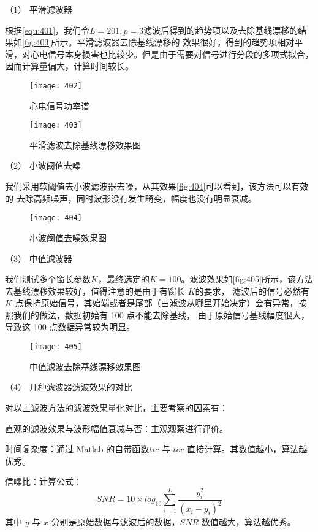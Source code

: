 （1） 平滑滤波器

根据\autoref{equ:401}，我们令$L=201,p=3$滤波后得到的趋势项以及去除基线漂移的结果如\autoref{fig:403}所示。平滑滤波器去除基线漂移的
效果很好，得到的趋势项相对平滑，对心电信号本身损害也比较少。但是由于需要对信号进行分段的多项式拟合，因而计算量偏大，计算时间较长。

\begin{figure}[htbp]
    \centering
    \texttt{[image: 402]}
    \caption{\label{fig:402}心电信号功率谱}
\end{figure}
\begin{figure}[htbp]
    \centering
    \texttt{[image: 403]}
    \caption{\label{fig:403}平滑滤波去除基线漂移效果图}
\end{figure}

（2）	小波阈值去噪 

我们采用软阈值去小波滤波器去噪，从其效果\autoref{fig:404}可以看到，该方法可以有效的
去除高频噪声，同时波形没有发生畸变，幅度也没有明显衰减。 
\begin{figure}[htbp]
    \centering
    \texttt{[image: 404]}
    \caption{\label{fig:404}小波阈值去噪效果图}
\end{figure}

（3）	中值滤波器 

我们测试多个窗长参数$K$，最终选定的$K = 100$。滤波效果如\autoref{fig:405}所示，该方法去基线漂移效果较好，值得注意的是由于有窗长 $K$的要求，
滤波后的信号必然有 $K$ 点保持原始信号，其始端或者是尾部（由滤波从哪里开始决定）会有异常，按照我们的做法，数据初始有 100 点不能去除基线，
由于原始信号基线幅度很大，导致这 100 点数据异常较为明显。 
\begin{figure}[htbp]
    \centering
    \texttt{[image: 405]}
    \caption{\label{fig:405}中值滤波去除基线漂移效果图}
\end{figure}

（4）	几种滤波器滤波效果的对比 

对以上滤波方法的滤波效果量化对比，主要考察的因素有： 

直观的滤波效果与波形幅值衰减与否：主观观察进行评价。 

时间复杂度：通过 Matlab 的自带函数$tic$ 与 $toc$ 直接计算。其数值越小，算法越优秀。 

信噪比：计算公式： 
\begin{equation}
    \label{equ:409}
    SNR=10 \times log_{10}\sum_{i=1}^L\frac{y_i^2}{(x_i-y_i)^2}
\end{equation}
其中 $y$ 与 $x$ 分别是原始数据与滤波后的数据，$SNR$ 数值越大，算法越优秀。 

